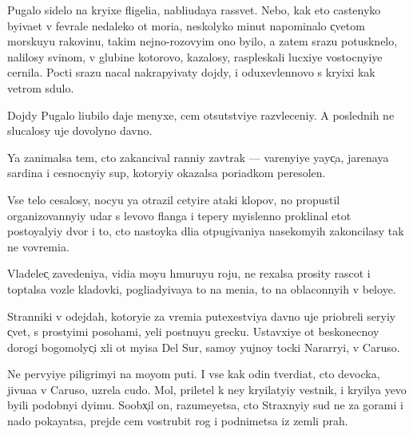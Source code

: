 \documentclass[10pt]{book}
\begin{document}
\newcommand{\X}{X̹}
\newcommand{\x}{x̹}
\newcommand{\C}{C̹}
\renewcommand{\c}{c̹}
\newcommand{\iopick}{u}

\newcommand{\e}{ë}
\newcommand{\yi}{\mbox{y\hspace{-0.55pt}ı}}
\newcommand{\ia}{\mbox{ı\hspace{-0.55pt}a}}
\newcommand{\io}{\mbox{ı\hspace{-0.55pt}\iopick}}
\newcommand{\y}{y̆}
\newcommand{\Y}{Y̆}

\renewcommand{\e}{e}
\renewcommand{\y}{y}
\renewcommand{\Y}{Y}

\renewcommand{\yi}{yi}
\renewcommand{\ia}{ia}
\renewcommand{\io}{i\iopick}

Pugalo sidelo na kr{\yi}xe fligel{\ia}, nabl{\io}da{\y}a rassvet. Nebo, kak eto castenyko b{\yi}\-va\-{\y}et v fevrale nedaleko ot mor{\ia}, neskolyko minut napominalo {\c}vetom morsku{\y}u rakovinu, takim nejno-rozov{\yi}m ono b{\yi}lo, a zatem srazu potusknelo, nalilosy svin\-{\c}om, v glubine kotorovo, kazalosy, raspleskali lucxi{\y}e vostocn{\yi}{\y}e cernila. Pocti srazu nacal nakrap{\yi}vaty dojdy, i oduxevl{\e}nnovo s kr{\yi}xi kak vetrom sdulo.

Dojdy Pugalo l{\io}bilo daje menyxe, cem otsutstvi{\y}e razvleceni{\y}. A poslednih ne slucalosy uje dovolyno davno.

{\Y}a zanimalsa tem, cto zakancival ranni{\y} zavtrak — var{\e}n{\yi}{\y}e {\y}a{\y}{\c}a, jarena{\y}a sardina i cesnocn{\yi}{\y} sup, kotor{\yi}{\y} okazalsa por{\ia}dkom peresolen.

Vs{\e} telo cesalosy, noc{\y}u {\y}a otrazil cet{\yi}re ataki klopov, no propustil organi\-zo\-van\-n{\yi}{\y} udar s levovo flanga i tepery m{\yi}slenno proklinal etot posto{\y}al{\yi}{\y} dvor i to, cto nasto{\y}ka dl{\ia} otpugivani{\y}a nasekom{\yi}h zakoncilasy tak ne vovrem{\ia}.

Vladele{\c} zavedeni{\y}a, vid{\ia} mo{\y}u hmuru{\y}u roju, ne rexalsa prosity rascot i toptalsa voz\-le kladovki, pogl{\ia}d{\yi}va{\y}a to na men{\ia}, to na oblaconn{\yi}h v belo{\y}e.

Stranniki v odejdah, ko\-to\-r{\yi}\-{\y}e za vrem{\ia} putexestvi{\y}a davno uje priobreli ser{\yi}{\y} {\c}vet, s prost{\yi}mi posohami, {\y}eli postnu{\y}u grecku. Ustavxi{\y}e ot beskonecno{\y} dorogi bogomoly{\c}i xli ot m{\yi}sa Del Sur, samo{\y} {\y}ujno{\y} tocki Nararr{\yi}, v Caruso.

Ne perv{\yi}{\y}e piligrim{\yi} na mo{\y}om puti. I vse kak odin tverd{\ia}t, cto devocka, ji\-vu\-{\x}a\-{\y}a v Caruso, uzrela cudo. Mol, priletel k ne{\y} kr{\yi}lat{\yi}{\y} vestnik, i kr{\yi}l{\y}a {\y}evo b{\yi}li podobn{\yi} d{\yi}mu. Soob{\x}il on, razume{\y}etsa, cto Straxn{\yi}{\y} sud ne za gorami i nado poka{\y}atsa, prejde cem vostrubit rog i podnimetsa iz zemli prah.
\end{document}

